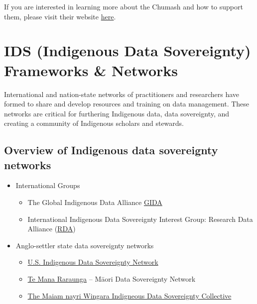 \documentclass[
]{book}
\providecommand{\tightlist}{%
  \setlength{\itemsep}{0pt}\setlength{\parskip}{0pt}}
\begin{document}
If you are interested in learning more about the Chumash and how to support them, please visit their website \href{https://www.wishtoyo.org/}{here}.

\hypertarget{ids-indigenous-data-sovereignty-frameworks-networks}{%
\chapter{IDS (Indigenous Data Sovereignty) Frameworks \& Networks}\label{ids-indigenous-data-sovereignty-frameworks-networks}}

International and nation-state networks of practitioners and researchers have formed to share and develop resources and training on data management. These networks are critical for furthering Indigenous data, data sovereignty, and creating a community of Indigenous scholars and stewards.

\hypertarget{overview-of-indigenous-data-sovereignty-networks}{%
\section*{Overview of Indigenous data sovereignty networks}\label{overview-of-indigenous-data-sovereignty-networks}}

\begin{itemize}
\tightlist
\item
  International Groups

  \begin{itemize}
  \tightlist
  \item
    The Global Indigenous Data Alliance \href{https://www.gida-global.org/}{GIDA}
  \item
    International Indigenous Data Sovereignty Interest Group: Research Data Alliance (\href{https://www.rd-alliance.org/groups/international-indigenous-data-sovereignty-ig}{RDA})
  \end{itemize}
\item
  Anglo-settler state data sovereignty networks

  \begin{itemize}
  \tightlist
  \item
    \href{https://usindigenousdata.org/}{U.S. Indigenous Data Sovereignty Network}
  \item
    \href{https://www.temanararaunga.maori.nz/}{Te Mana Raraunga} -- Māori Data Sovereignty Network
  \item
    \href{https://www.maiamnayriwingara.org/}{The Maiam nayri Wingara Indigneous Data Sovereignty Collective}
  \end{itemize}
\end{itemize}
\end{document}
